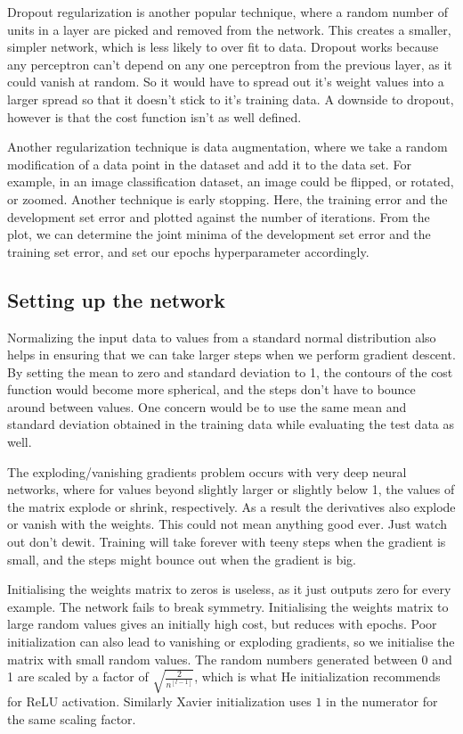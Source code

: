 \documentclass{article}
\begin{document}
Dropout regularization is another popular technique, where a random number of units in a layer are picked and removed from the network. This creates a smaller, simpler network, which is less likely to over fit to data. Dropout works because any perceptron can't depend on any one perceptron from the previous layer, as it could vanish at random. So it would have to spread out it's weight values into a larger spread so that it doesn't stick to it's training data. A downside to dropout, however is that the cost function isn't as well defined.

Another regularization technique is data augmentation, where we take a random modification of a data point in the dataset and add it to the data set. For example, in an image classification dataset, an image could be flipped, or rotated, or zoomed. Another technique is early stopping. Here, the training error and the development set error and plotted against the number of iterations. From the plot, we can determine the joint minima of the development set error and the training set error, and set our epochs hyperparameter accordingly.

\subsection{Setting up the network}

Normalizing the input data to values from a standard normal distribution also helps in ensuring that we can take larger steps when we perform gradient descent. By setting the mean to zero and standard deviation to 1, the contours of the cost function would become more spherical, and the steps don't have to bounce around between values. One concern would be to use the same mean and standard deviation obtained in the training data while evaluating the test data as well. 

The exploding/vanishing gradients problem occurs with very deep neural networks, where for values beyond slightly larger or slightly below 1, the values of the matrix explode or shrink, respectively. As a result the derivatives also explode or vanish with the weights. This could not mean anything good ever. Just watch out don't dewit. Training will take forever with teeny steps when the gradient is small, and the steps might bounce out when the gradient is big.

Initialising the weights matrix to zeros is useless, as it just outputs zero for every example. The network fails to break symmetry. Initialising the weights matrix to large random values gives an initially high cost, but reduces with epochs. Poor initialization can also lead to vanishing or exploding gradients, so we initialise the matrix with small random values. The random numbers generated between 0 and 1 are scaled by a factor of $\sqrt{\frac{2}{n^{[l-1]}}}$, which is what He initialization recommends for ReLU activation. Similarly Xavier initialization uses $1$ in the numerator for the same scaling factor. 
\end{document}

